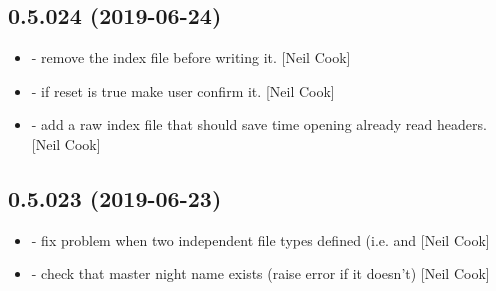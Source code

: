 \documentclass[a4paper,10pt,english]{report}
\begin{document}
\subsection{0.5.024 (2019-06-24)}
\label{\detokenize{misc/changelog:id113}}\begin{itemize}
\item {} 
 - remove the index file before writing it. {[}Neil Cook{]}

\item {} 
 - if reset is true make user confirm it. {[}Neil Cook{]}

\item {} 
 - add a raw index file that should save time opening
already read headers. {[}Neil Cook{]}

\end{itemize}


\subsection{0.5.023 (2019-06-23)}
\label{\detokenize{misc/changelog:id114}}\begin{itemize}
\item {} 
 - fix problem when two independent file types defined
(i.e.  and  {[}Neil Cook{]}

\item {} 
 - check that master night name exists (raise error if it
doesn’t) {[}Neil Cook{]}

\end{itemize}
\end{document}
